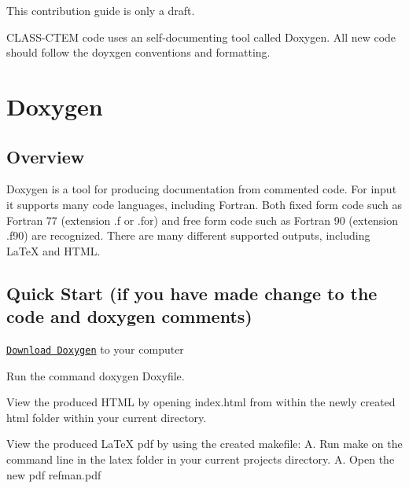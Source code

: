 This contribution guide is only a draft.

C\+L\+A\+S\+S-\/\+C\+T\+E\+M code uses an self-\/documenting tool called Doxygen. All new code should follow the doyxgen conventions and formatting.

\section*{Doxygen}

\subsection*{Overview}

Doxygen is a tool for producing documentation from commented code. For input it supports many code languages, including Fortran. Both fixed form code such as Fortran 77 (extension .f or .for) and free form code such as Fortran 90 (extension .f90) are recognized. There are many different supported outputs, including La\+Te\+X and H\+T\+M\+L.

\subsection*{Quick Start (if you have made change to the code and doxygen comments)}


\begin{DoxyEnumerate}
\item \href{http://www.stack.nl/~dimitri/doxygen/download.html}{\tt Download Doxygen} to your computer
\end{DoxyEnumerate}
\begin{DoxyEnumerate}
\item Run the command \textquotesingle{}doxygen Doxyfile\textquotesingle{}.
\end{DoxyEnumerate}
\begin{DoxyEnumerate}
\item View the produced H\+T\+M\+L by opening \textquotesingle{}index.\+html\textquotesingle{} from within the newly created \textquotesingle{}html\textquotesingle{} folder within your current directory.
\end{DoxyEnumerate}
\begin{DoxyEnumerate}
\item View the produced La\+Te\+X pdf by using the created makefile\+: A. Run \textquotesingle{}make\textquotesingle{} on the command line in the \textquotesingle{}latex\textquotesingle{} folder in your current project\textquotesingle{}s directory. A. Open the new pdf \textquotesingle{}refman.\+pdf\textquotesingle{}
\end{DoxyEnumerate}

